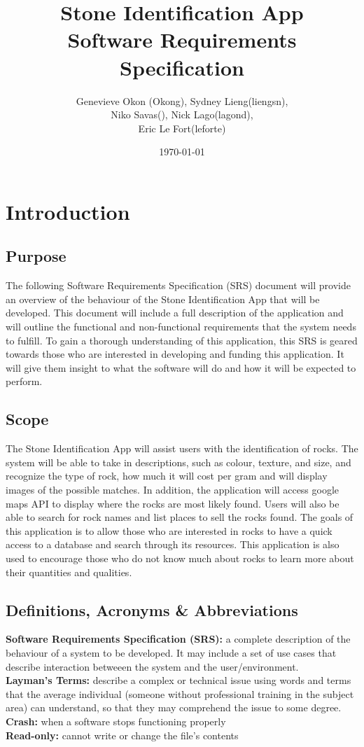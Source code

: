 \documentclass[titlepage]{article}
\begin{document}
	\title{Stone Identification App \\
		Software Requirements Specification}
	\author{Genevieve Okon (Okong), Sydney Lieng(liengsn),\\
		Niko Savas(), Nick Lago(lagond),\\
		Eric Le Fort(leforte)}
	\date{\today}
	\maketitle
	
\section{Introduction}
\subsection{Purpose}
The following Software Requirements Specification (SRS) document will provide an overview of the behaviour of the Stone Identification App that will be developed. This document will include a full description of the application and will outline the functional and non-functional requirements that the system needs to fulfill. To gain a thorough understanding of this application, this SRS is geared towards those who are interested in developing and funding this application. It will give them insight to what the software will do and how it will be expected to perform.
\subsection{Scope}
The Stone Identification App will assist users with the identification of rocks. The system will be able to take in descriptions, such as colour, texture, and size, and recognize the type of rock, how much it will cost per gram and will display images of the possible matches. In addition, the application will access google maps API to display where the rocks are most likely found. Users will also be able to search for rock names and list places to sell the rocks found. The goals of this application is to allow those who are interested in rocks to have a quick access to a database and search through its resources. This application is also used to encourage those who do not know much about rocks to learn more about their quantities and qualities. 
\subsection{Definitions, Acronyms \& Abbreviations}
\textbf{Software Requirements Specification (SRS):} a complete description of the behaviour of a system to be developed. It may include a set of use cases that describe interaction betweeen the system and the user/environment.\\
\textbf{Layman's Terms:} describe a complex or technical issue using words and terms that the average individual (someone without professional training in the subject area) can understand, so that they may comprehend the issue to some degree.\\
\textbf{Crash:} when a software stops functioning properly\\
\textbf{Read-only:} cannot write or change the file's contents
\end{document}
